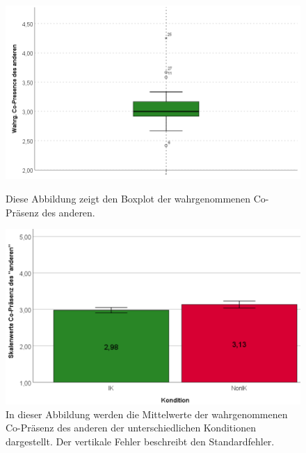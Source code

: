 \documentclass[a4paper,11pt]{article}%
\renewcommand{\\}{\vspace*{0.5\baselineskip} \newline}
\begin{document}
	\begin{figure}[H]
   \begin{minipage}[t]{.5\linewidth} %
      \includegraphics[width=\linewidth]{Abbildungen/AuswertungDiagramme/BP_OtherCoPresence.png}
      \caption[Boxplot der selbst wahrgenommenen Co-Präsenz]{Diese Abbildung zeigt den Boxplot der wahrgenommenen Co-Präsenz des \dq{}anderen\dq{}.}
            \label{SD_OtherCoPresenceBP}
   \end{minipage}
   \hspace{.02\linewidth}%
   \begin{minipage}[t]{.5\linewidth} %
     \includegraphics[width=\linewidth]{Abbildungen/AuswertungDiagramme/SD_OtherCoPresence_Mittelwerte.png}
      \caption[Durchschnittliche wahrgenommene Co-Präsenz des \dq{}anderen\dq{} der Konditionen]{In dieser Abbildung werden die Mittelwerte der wahrgenommenen Co-Präsenz des \dq{}anderen\dq{} der unterschiedlichen Konditionen dargestellt. Der vertikale Fehler beschreibt den Standardfehler.}
       \label{SD_SelbstCoPresence_Mittelwerte}
   \end{minipage}
\end{figure}
\end{document}
